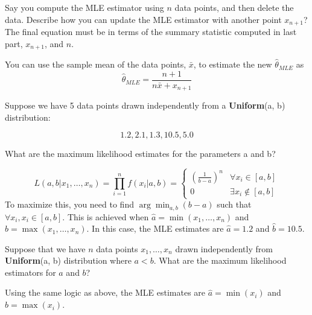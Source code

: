 \documentclass{article}
\begin{document}
\begin{probset}
\begin{prob}
\begin{subprobset}
    \begin{subprob}
        Say you compute the MLE estimator using $n$ data points, and then delete the data. Describe how you can update the MLE estimator with another point $x_{n+1}$? The final equation must be in terms of the summary statistic computed in last part, $x_{n+1}$, and $n$.

        \begin{soln}
            You can use the sample mean of the data points, $\bar{x}$, to estimate the new $\hat{\theta}_{MLE}$ as 
            \[ \hat{\theta}_{MLE} = \frac{n+1}{n\bar{x} + x_{n+1}} \]
        \end{soln}
    \end{subprob}
\end{subprobset}
\end{prob}

\newpage

\begin{prob}
Suppose we have 5 data points drawn independently from a \textbf{Uniform}(a, b) distribution:

\[ 1.2, 2.1, 1.3, 10.5, 5.0 \]

\begin{subprobset}
    \begin{subprob}
        What are the maximum likelihood estimates for the parameters a and b?

        \begin{soln}
            \[ L(a,b | x_1, \dots, x_n) = \prod_{i=1}^n f(x_i|a,b) = \begin{cases} \left( \frac{1}{b-a} \right)^n & \forall x_i \in [a,b] \\ 0 & \exists x_i \notin [a,b] \end{cases} \]
            To maximize this, you need to find $\arg\min_{a,b} (b - a)$ such that $\forall x_i, x_i \in [a,b]$. This is achieved when $\hat a = \min(x_1, \dots, x_n)$ and $\hat b = \max(x_1, \dots, x_n)$. In this case, the MLE estimates are $\hat a = 1.2$ and $\hat b = 10.5$.
        \end{soln}
    \end{subprob}

    \begin{subprob}
        Suppose that we have $n$ data points $x_1, \dots, x_n$ drawn independently from \textbf{Uniform}(a, b) distribution where $a < b$. What are the maximum likelihood estimators for $a$ and $b$?

        \begin{soln}
            Using the same logic as above, the MLE estimates are $\hat a = \min(x_i)$ and $\hat b = \max(x_i)$.
        \end{soln}
    \end{subprob}
\end{subprobset}
\end{prob}


\end{probset}
\end{document}
